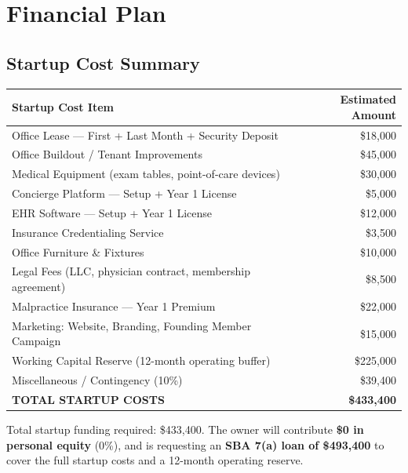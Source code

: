 \documentclass[11pt,letterpaper]{article}
\newcommand{\thead}[1]{\cellcolor{navy}\color{white}\bfseries\small #1}
\newcommand{\trow}{\rowcolor{rowshade}}
\newcommand{\ttotalrow}{\rowcolor{totalrow}}
\begin{document}
\newpage

\section{Financial Plan}

\subsection{Startup Cost Summary}

\vspace{6pt}
\begin{tabularx}{\linewidth}{|>{\small}X|>{\small}r|}
\hline
\thead{Startup Cost Item} & \thead{Estimated Amount} \\
\hline
\trow Office Lease --- First + Last Month + Security Deposit & \$18,000 \\
Office Buildout / Tenant Improvements & \$45,000 \\
\trow Medical Equipment (exam tables, point-of-care devices) & \$30,000 \\
Concierge Platform --- Setup + Year 1 License & \$5,000 \\
\trow EHR Software --- Setup + Year 1 License & \$12,000 \\
Insurance Credentialing Service & \$3,500 \\
\trow Office Furniture \& Fixtures & \$10,000 \\
Legal Fees (LLC, physician contract, membership agreement) & \$8,500 \\
\trow Malpractice Insurance --- Year 1 Premium & \$22,000 \\
Marketing: Website, Branding, Founding Member Campaign & \$15,000 \\
\trow Working Capital Reserve (12-month operating buffer) & \$225,000 \\
Miscellaneous / Contingency (10\%) & \$39,400 \\
\hline
\ttotalrow \textbf{TOTAL STARTUP COSTS} & \textbf{\$433,400} \\
\hline
\end{tabularx}

\medskip
Total startup funding required: \$433,400. The owner will contribute \textbf{\$0 in personal equity} (0\%), and is requesting an \textbf{SBA 7(a) loan of \$493,400} to cover the full startup costs and a 12-month operating reserve.
\end{document}
